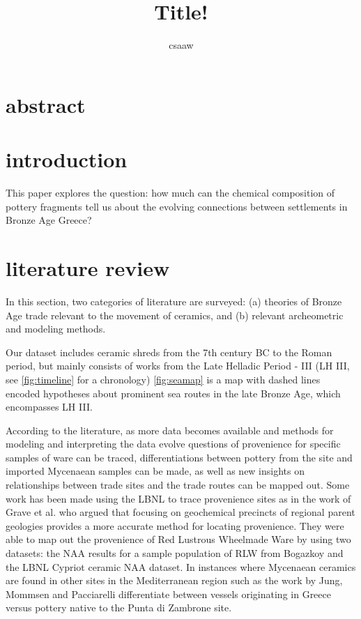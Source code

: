 \documentclass[10pt,a4paper]{article}
\author{csaaw}
\title{Title!}
\begin{document}
\maketitle

\section*{abstract}

\section{introduction}
\label{sec:intro}

This paper explores the question: how much can the chemical composition of pottery fragments tell us about the evolving connections between settlements in Bronze Age Greece? 



\section{literature review}
\label{sec:litrev}

In this section, two categories of literature are surveyed: (a) theories of Bronze Age trade relevant to the movement of ceramics, and (b) relevant archeometric and modeling methods.

Our dataset includes ceramic shreds from the 7th century BC to the Roman period, but mainly consists of works from the Late Helladic Period - III (LH III, see \cref{fig:timeline} for a chronology)
\cref{fig:seamap} is a map with dashed lines encoded hypotheses about prominent sea routes in the late Bronze Age, which encompasses LH III. 

According to the literature, as more data becomes available and methods for modeling and interpreting the data evolve questions of provenience for specific samples of ware can be traced, differentiations between pottery from the site and imported Mycenaean samples can be made, as well as new insights on relationships between trade sites and the trade routes can be mapped out.  Some work has been made using the LBNL to trace provenience sites as in the work of Grave et al.\cite{grave2014ceramics} who argued that focusing on geochemical precincts of regional parent geologies provides a more accurate method for locating provenience.  They were able to map out the provenience of Red Lustrous Wheelmade Ware by using two datasets:  the NAA results for a sample population of RLW from Bogazkoy and the LBNL Cypriot ceramic NAA dataset.  In instances where Mycenaean ceramics are found in other sites in the Mediterranean region such as the work by Jung, Mommsen and Pacciarelli\cite{jung2015west} differentiate between vessels originating in Greece versus pottery native to the Punta di Zambrone site.  
\end{document}
